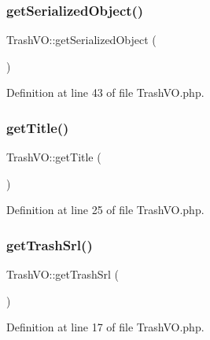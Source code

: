 \hypertarget{classTrashVO_a7f5cb9198a27ef7e31ea8338142ea0a4}{}\label{classTrashVO_a7f5cb9198a27ef7e31ea8338142ea0a4} 
\subsubsection{\texorpdfstring{get\+Serialized\+Object()}{getSerializedObject()}}
{\footnotesize\ttfamily Trash\+V\+O\+::get\+Serialized\+Object (\begin{DoxyParamCaption}{ }\end{DoxyParamCaption})}



Definition at line 43 of file Trash\+V\+O.\+php.

\hypertarget{classTrashVO_aa4440a7a7319733fc927eae9bf4dc243}{}\label{classTrashVO_aa4440a7a7319733fc927eae9bf4dc243} 
\subsubsection{\texorpdfstring{get\+Title()}{getTitle()}}
{\footnotesize\ttfamily Trash\+V\+O\+::get\+Title (\begin{DoxyParamCaption}{ }\end{DoxyParamCaption})}



Definition at line 25 of file Trash\+V\+O.\+php.

\hypertarget{classTrashVO_a6b59d9f110a8916702b4bdb094c1108f}{}\label{classTrashVO_a6b59d9f110a8916702b4bdb094c1108f} 
\subsubsection{\texorpdfstring{get\+Trash\+Srl()}{getTrashSrl()}}
{\footnotesize\ttfamily Trash\+V\+O\+::get\+Trash\+Srl (\begin{DoxyParamCaption}{ }\end{DoxyParamCaption})}



Definition at line 17 of file Trash\+V\+O.\+php.

\hypertarget{classTrashVO_aa36403521f23444042160f2670e0b765}{}\label{classTrashVO_aa36403521f23444042160f2670e0b765} 
